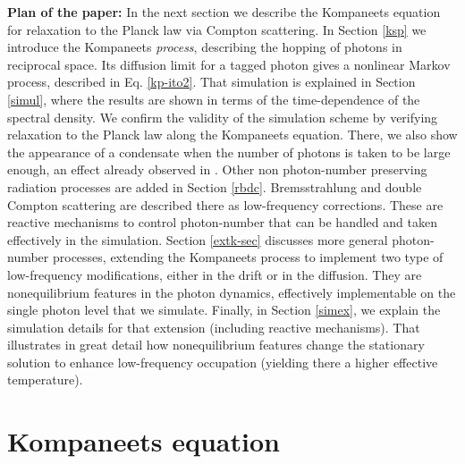 \documentclass[a4paper,12pt,reqno,superscriptaddress,nofootinbib]{revtex4}
\newcommand{\0}{^{(0)}}
\newcommand{\1}{^{(1)}}
\newcommand{\2}{^{(2)}}
\begin{document}
\textbf{Plan of the paper:}  In the next section we describe the Kompaneets equation for relaxation to the Planck law via Compton scattering.  In Section \ref{ksp} we introduce the Kompaneets {\it process}, describing the hopping of photons in reciprocal space.  Its diffusion limit for a tagged photon gives a nonlinear Markov process, described in Eq. \eqref{kp-ito2}.   That simulation is explained in Section \ref{simul}, where the results are shown in terms of the time-dependence of the spectral density. We confirm the validity of the simulation scheme by verifying relaxation to the Planck law along the Kompaneets equation. There, we also show the appearance of a condensate when the number of photons is taken to be large enough, an effect already observed in \cite{levermore}. Other non photon-number preserving radiation processes are added in Section 
\ref{rbdc}. Bremsstrahlung and double Compton scattering are described there as low-frequency corrections. These are reactive mechanisms to control photon-number that can be handled and taken effectively in the simulation.   Section \ref{extk-sec} discusses more general photon-number processes, extending the Kompaneets process to implement two type of low-frequency modifications, either in the drift or in the diffusion. They are nonequilibrium features in the photon dynamics, effectively implementable on the single photon level that we simulate. Finally, in Section \ref{simex}, we explain the simulation details for that extension (including reactive mechanisms). That illustrates in great detail how nonequilibrium features change the stationary solution to enhance low-frequency occupation (yielding there a higher effective temperature). 






\section{Kompaneets equation}
\end{document}
